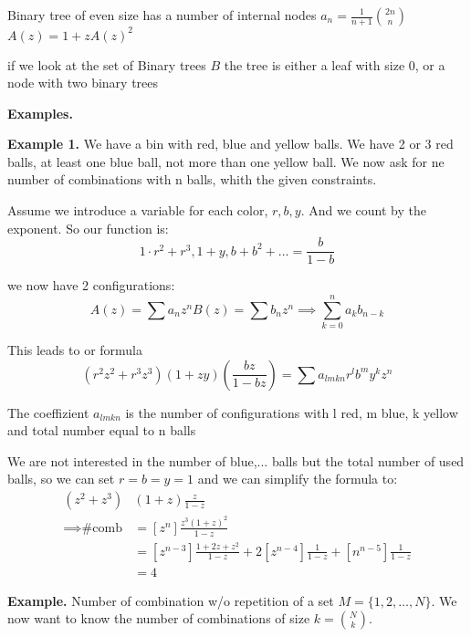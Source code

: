 


Binary tree of even size has a number of internal nodes $a_n = \frac{1}{n+1} {2n \choose n}$
$A(z) = 1 + zA(z)^2$

if we look at the set of Binary trees $B$ the tree is either a leaf with size 0, or a node with two binary trees

\textbf{Examples.}

\textbf{Example 1.}
We have a bin with red, blue and yellow balls. 
We have 2 or 3 red balls, at least one blue ball, not more than one yellow ball.
We now ask for ne number of combinations with n balls, whith the given constraints. 

Assume we introduce a variable for each color, $r,b,y$. And we count by the exponent. So our function is:
\[
    1\cdot r^2 + r^3,  1+y, b + b^2 + \ldots = \frac{b}{1-b}
\]

we now have 2 configurations:
\[
    A(z) = \sum a_n z^n
    B(z) = \sum b_n z^n
    \implies \sum_{k=0}^{n} a_k b_{n-k}
\]

This leads to or formula
\[
    (r^2  z^2+ r^3 z^3) (1+zy) \left(\frac{bz}{1-bz}\right) 
    = \sum a_{lmkn} r^l b^m y^k z^n
\]

The coeffizient $a_{lmkn}$ is the number of configurations with l red, m blue, k yellow and total number equal to n balls

We are not interested in the number of blue,... balls but the total number of used balls, so we can set $r=b=y=1$ and we can simplify the formula to:
\begin{align*}
    (z^2 + z^3)&(1+z) \frac{z}{1-z} \\
    \implies \text{\# comb} 
    &= \left[z^n\right] \frac{z^3(1+z)^2}{1-z} \\
    &= \left[z^{n-3}\right] \frac{1+2z +z^2}{1-z}+ 2\left[z^{n-4}\right] \frac{1}{1-z} + \left[n^{n-5}\right] \frac{1}{1-z} \\
    &= 4
\end{align*}

\textbf{Example.} 
Number of combination w/o repetition of a set $M = \{1,2, \ldots ,N\}$. We now want to know the number of combinations of size $k = {N \choose k}$.

